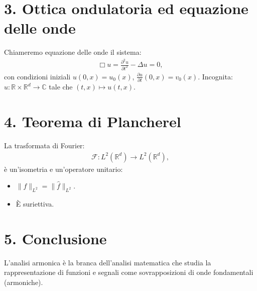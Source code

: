 \section*{3. Ottica ondulatoria ed equazione delle onde}

\begin{definition}
Chiameremo equazione delle onde il sistema: 
    \begin{align*}
        \Box u = \frac{\partial^2 u}{\partial t^2} - \Delta u = 0,
    \end{align*}
    con condizioni iniziali $u(0, x) = u_0(x)$, $\frac{\partial u}{\partial t}(0, x) = v_0(x)$.
Incognita: $u: \mathbb{R}\times \mathbb{R}^d \to \mathbb{C}$ tale che $(t,x) \mapsto u(t, x)$.
\end{definition}


\section*{4. Teorema di Plancherel}
La trasformata di Fourier:
\begin{align*}
    \mathcal{\mathcal{F}}: L^2(\mathbb{R}^d) \to L^2(\mathbb{R}^d),
\end{align*}
è un'isometria e un'operatore unitario:
\begin{itemize}
    \item $\|f\|_{L^2} = \|\hat{f}\|_{L^2}$.
    \item È suriettiva.
\end{itemize}

\section*{5. Conclusione}
L'analisi armonica è la branca dell'analisi matematica che studia la rappresentazione di funzioni e segnali come sovrapposizioni di onde fondamentali (armoniche).
